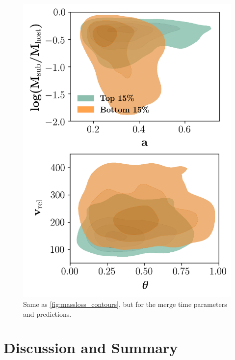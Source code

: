\documentclass[fleqn,usenatbib]{mnras}
\begin{document}
\begin{figure}
	\includegraphics[width=\textwidth]{Figures/time_contours}
    \caption{Same as \ref{fig:massloss_contours}, but for the merge time parameters and predictions.}
    \label{fig:time_contours}
\end{figure}


\section{Discussion and Summary}
\label{sec:Conclusion}
\end{document}
